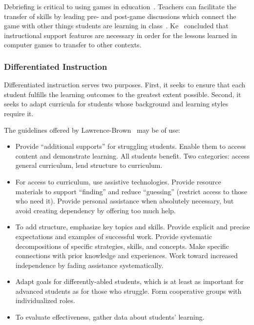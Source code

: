 \documentclass{sig-alternate-05-2015}
\begin{document}
Debriefing is critical to using games in education~\cite{lederman1995debriefing}. Teachers can facilitate the transfer of skills by leading pre- and post-game discussions which connect the game with other things students are learning in class~\cite{ash2011digital}. Ke~\cite{ke2009qualitative} concluded that instructional support features are necessary in order for the lessons learned in computer games to transfer to other contexts.\subsubsection{Differentiated Instruction}


Differentiated instruction serves two purposes. First, it seeks to ensure that each student fulfills the learning outcomes to the greatest extent possible. Second, it seeks to adapt curricula for students whose background and learning styles require it.



The guidelines offered by Lawrence-Brown~\cite{lawrence2004differentiated} may be of use:

\begin{itemize}
\item Provide ``additional supports'' for struggling students. Enable them to access content and demonstrate learning. All students benefit. Two categories: access general curriculum, lend structure to curriculum.
\item For access to curriculum, use assistive technologies. Provide resource materials to support ``finding'' and reduce ``guessing'' (restrict access to those who need it). Provide personal assistance when absolutely necessary, but avoid creating dependency by offering too much help.
\item To add structure, emphasize key topics and skills. Provide explicit and precise expectations and examples of successful work. Provide systematic decompositions of specific strategies, skills, and concepts. Make specific connections with prior knowledge and experiences. Work toward increased independence by fading assistance systematically. 
\item Adapt goals for differently-abled students, which is at least as important for advanced students as for those who struggle. Form cooperative groups with individualized roles.
\item To evaluate effectiveness, gather data about students' learning.
\end{itemize}
\end{document}
